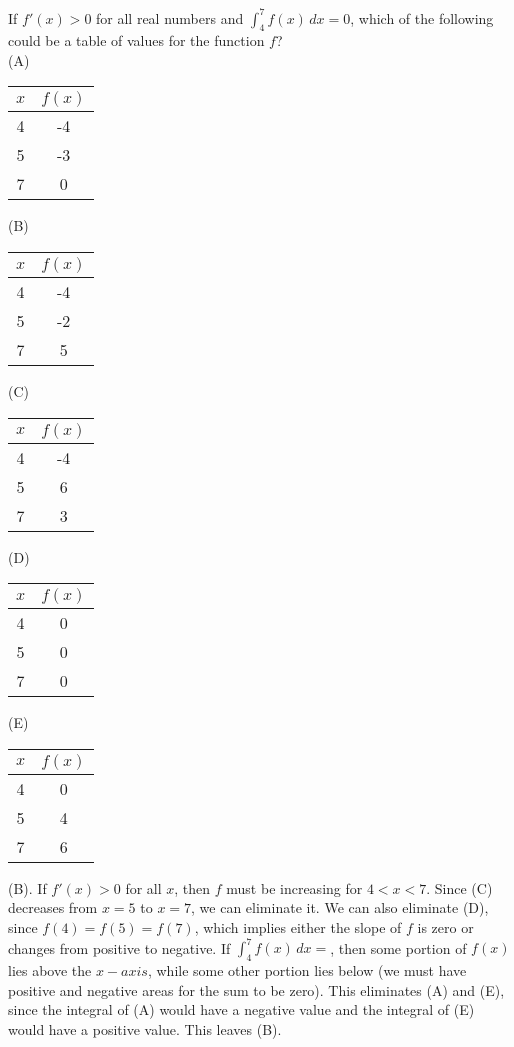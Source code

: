 \begin{Exercise} If $f'(x) > 0$ for all real 
numbers and $\int_4^7 f(x)\,dx = 0$, which of the following could be a table 
of values for the function $f$?\\
(A) \begin{tabular}{|c|c|}\hline
$x$ & $f(x)$\\\hline
4 & -4\\\hline
5 & -3\\\hline
7 & 0\\\hline
\end{tabular}
(B)\begin{tabular}{|c|c|}\hline
$x$ & $f(x)$\\\hline
4 & -4\\\hline
5 & -2\\\hline
7 & 5\\\hline
\end{tabular}
(C)\begin{tabular}{|c|c|}\hline
$x$ & $f(x)$\\\hline
4 & -4\\\hline
5 & 6\\\hline
7 & 3\\\hline
\end{tabular}
(D)\begin{tabular}{|c|c|}\hline
$x$ & $f(x)$\\\hline
4 & 0\\\hline
5 & 0\\\hline
7 & 0\\\hline
\end{tabular}
(E)\begin{tabular}{|c|c|}\hline
$x$ & $f(x)$\\\hline
4 & 0\\\hline
5 & 4\\\hline
7 & 6\\\hline
\end{tabular}
\end{Exercise}

\begin{Answer}[ref = defint5]
(B). If $f'(x) > 0$ for all $x$, then $f$ must be increasing for $4 < x < 7$. 
Since (C) decreases from $x = 5$ to $x = 7$, we can eliminate it. We can also 
eliminate (D), since $f(4) = f(5) = f(7)$, which implies either the slope of 
$f$ is zero or changes from positive to negative. If $\int_4^7 f(x)\,dx = $, 
then some portion of $f(x)$ lies above the $x-axis$, while some other portion 
lies below (we must have positive and negative areas for the sum to be zero). 
This eliminates (A) and (E), since the integral of (A) would have a negative 
value and the integral of (E) would have a positive value. This leaves (B). 
\end{Answer}


